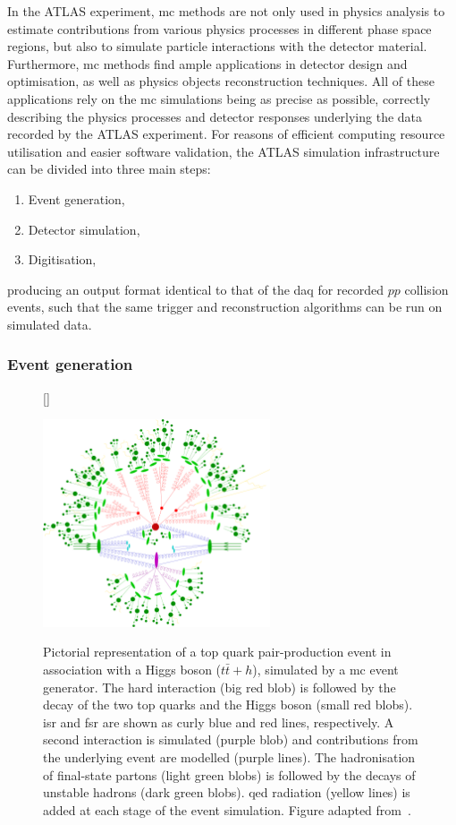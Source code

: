 In the ATLAS experiment, \gls{mc} methods are not only used in physics analysis to estimate contributions from various physics processes in different phase space regions, but also to simulate particle interactions with the detector material. Furthermore, \gls{mc} methods find ample applications in detector design and optimisation, as well as physics objects reconstruction techniques. All of these applications rely on the \gls{mc} simulations being as precise as possible, \ie correctly describing the physics processes and detector responses underlying the data recorded by the ATLAS experiment. For reasons of efficient computing resource utilisation and easier software validation, the ATLAS simulation infrastructure~\cite{Aad:2010ah} can be divided into three main steps:
\begin{enumerate}[label=(\roman*)]	
	\item Event generation,
	\item Detector simulation,
	\item Digitisation,
\end{enumerate}  
producing an output format identical to that of the \gls{daq} for recorded $pp$ collision events, such that the same trigger and reconstruction algorithms can be run on simulated data.

\subsubsection{Event generation}


\begin{figure}
[\FBwidth]
{\caption{Pictorial representation of a top quark pair-production event in association with a Higgs boson ($t\bar{t}+h$), simulated by a \gls{mc} event generator. The hard interaction (big red blob) is followed by the decay of the two top quarks and the Higgs boson (small red blobs). \gls{isr} and \gls{fsr} are shown as curly blue and red lines, respectively. A second interaction is simulated (purple blob) and contributions from the underlying event are modelled (purple lines). The hadronisation of final-state partons (light green blobs) is followed by the decays of unstable hadrons (dark green blobs). \gls{qed} radiation (yellow lines) is added at each stage of the event simulation. Figure adapted from~\cite{Gleisberg:2008ta}.}\label{fig:sherpa_event}}
{\includegraphics[width=0.6\textwidth]{sherpa_event}}
\end{figure}

